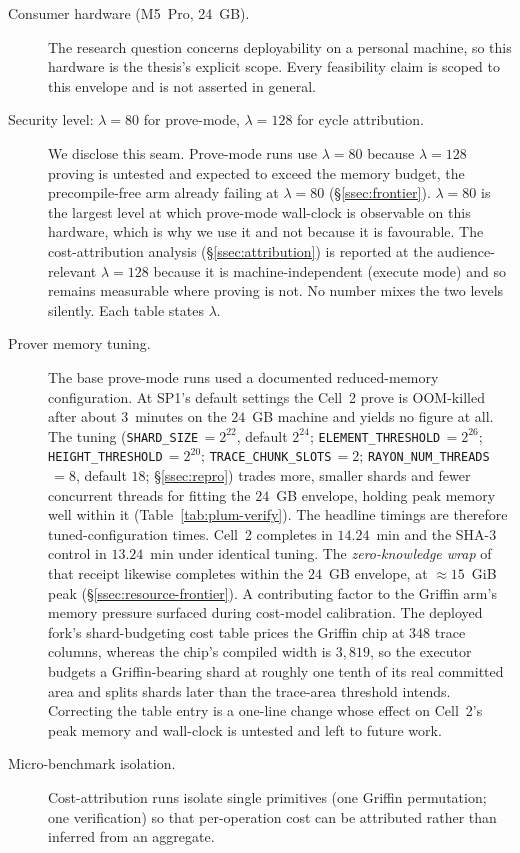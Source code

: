 \begin{description}
  \item[Consumer hardware (M5~Pro, 24~GB).] The research question concerns deployability on a personal machine, so this hardware is the thesis's explicit scope. Every feasibility claim is scoped to this envelope and is not asserted in general.
  \item[Security level: $\lambda=80$ for prove-mode, $\lambda=128$ for cycle attribution.] We disclose this seam. Prove-mode runs use $\lambda=80$ because $\lambda=128$ proving is untested and expected to exceed the memory budget, the precompile-free arm already failing at $\lambda=80$ (\S\ref{ssec:frontier}). $\lambda=80$ is the largest level at which prove-mode wall-clock is observable on this hardware, which is why we use it and not because it is favourable. The cost-attribution analysis (\S\ref{ssec:attribution}) is reported at the audience-relevant $\lambda=128$ because it is machine-independent (execute mode) and so remains measurable where proving is not. No number mixes the two levels silently. Each table states $\lambda$.
  \item[Prover memory tuning.] The base prove-mode runs used a documented reduced-memory configuration. At SP1's default settings the Cell~2 prove is OOM-killed after about $3$~minutes on the $24$~GB machine and yields no figure at all. The tuning (\texttt{SHARD\_SIZE}$\,=2^{22}$, default $2^{24}$; \texttt{ELEMENT\_THRESHOLD}$\,=2^{26}$; \texttt{HEIGHT\_THRESHOLD}$\,=2^{20}$; \texttt{TRACE\_CHUNK\_SLOTS}$\,=2$; \texttt{RAYON\_NUM\_THREADS}$\,=8$, default $18$; \S\ref{ssec:repro}) trades more, smaller shards and fewer concurrent threads for fitting the $24$~GB envelope, holding peak memory well within it (Table~\ref{tab:plum-verify}). The headline timings are therefore tuned-configuration times. Cell~2 completes in $14.24$~min and the SHA-3 control in $13.24$~min under identical tuning. The \emph{zero-knowledge wrap} of that receipt likewise completes within the $24$~GB envelope, at ${\approx}15$~GiB peak (\S\ref{ssec:resource-frontier}). A contributing factor to the Griffin arm's memory pressure surfaced during cost-model calibration. The deployed fork's shard-budgeting cost table prices the Griffin chip at $348$ trace columns, whereas the chip's compiled width is $3{,}819$, so the executor budgets a Griffin-bearing shard at roughly one tenth of its real committed area and splits shards later than the trace-area threshold intends. Correcting the table entry is a one-line change whose effect on Cell~2's peak memory and wall-clock is untested and left to future work.
  \item[Micro-benchmark isolation.] Cost-attribution runs isolate single primitives (one Griffin permutation; one verification) so that per-operation cost can be attributed rather than inferred from an aggregate.
\end{description}

